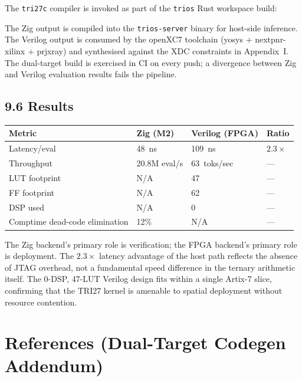 The \texttt{tri27c} compiler is invoked as part of
the \texttt{trios} Rust workspace build:

\begin{Shaded}
\begin{Highlighting}[]
\end{Highlighting}
\end{Shaded}

The Zig output is compiled into the
\texttt{trios-server} binary for host-side
inference. The Verilog output is consumed by the
openXC7 toolchain (yosys + nextpnr-xilinx +
prjxray) and synthesised against the XDC constraints
in Appendix~I. The dual-target build is exercised in
CI on every push; a divergence between Zig and
Verilog evaluation results fails the pipeline.

\subsection{9.6 Results}\label{fa_27:codegen-results}

\begin{longtable}[]{@{}llll@{}}
\toprule\noalign{}
Metric & Zig (M2) & Verilog (FPGA) & Ratio \\
\midrule\noalign{}
\endhead
\bottomrule\noalign{}
\endlastfoot
Latency/eval & 48~ns & 109~ns & $2.3\times$ \\
Throughput & 20.8M eval/s & 63~toks/sec & --- \\
LUT footprint & N/A & 47 & --- \\
FF footprint & N/A & 62 & --- \\
DSP used & N/A & 0 & --- \\
Comptime dead-code elimination & 12\% & N/A & --- \\
\end{longtable}

The Zig backend's primary role is verification; the
FPGA backend's primary role is deployment. The
$2.3\times$ latency advantage of the host path
reflects the absence of JTAG overhead, not a
fundamental speed difference in the ternary
arithmetic itself. The 0-DSP, 47-LUT Verilog design
fits within a single Artix-7 slice, confirming that
the TRI27 kernel is amenable to spatial deployment
without resource contention.

\section{References (Dual-Target Codegen
Addendum)}\label{fa_27:references-codegen}

